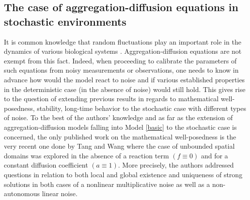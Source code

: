 \documentclass[10pt,number,preprint,times]{elsarticle}
\numberwithin{equation}{section} %
\begin{document}
\subsection{The case of aggregation-diffusion equations in stochastic environments}
It is common knowledge that random fluctuations play an important role in the dynamics of various biological systems \cite{mao2002environmental,gray2011stochastic,collins2012optimal,dhariwal2019global,mehdaoui2023dynamical,mehdaoui2023analysisstoch,mehdaoui2024well,bendahmane2023stochastic,sabbar2024exploring,sabbar2024probabilistic}. Aggregation-diffusion equations are not exempt from this fact. Indeed, when proceeding to calibrate the parameters of such equations from noisy measurements or observations, one needs to know in advance how would the model react to noise and if various established properties in the deterministic case (in the absence of noise) would still hold. This gives rise to the question of extending previous results in regards to mathematical well-posedness, stability, long-time behavior to the stochastic case with different types of noise. To the best of the authors' knowledge and as far as the extension of aggregation-diffusion models falling into Model \eqref{basic} to the stochastic case is concerned, the only published work on the mathematical well-posedness is the very recent one done by Tang and Wang \cite{tang2024strong} where the case of unbounded spatial domains was explored in the absence of a reaction term $(f \equiv 0)$ and for a constant diffusion coefficient $(a \equiv 1)$. More precisely, the authors addressed questions in relation to both local and global existence and uniqueness of strong solutions in both cases of a nonlinear multiplicative noise as well as a non-autonomous linear noise. 
\end{document}
